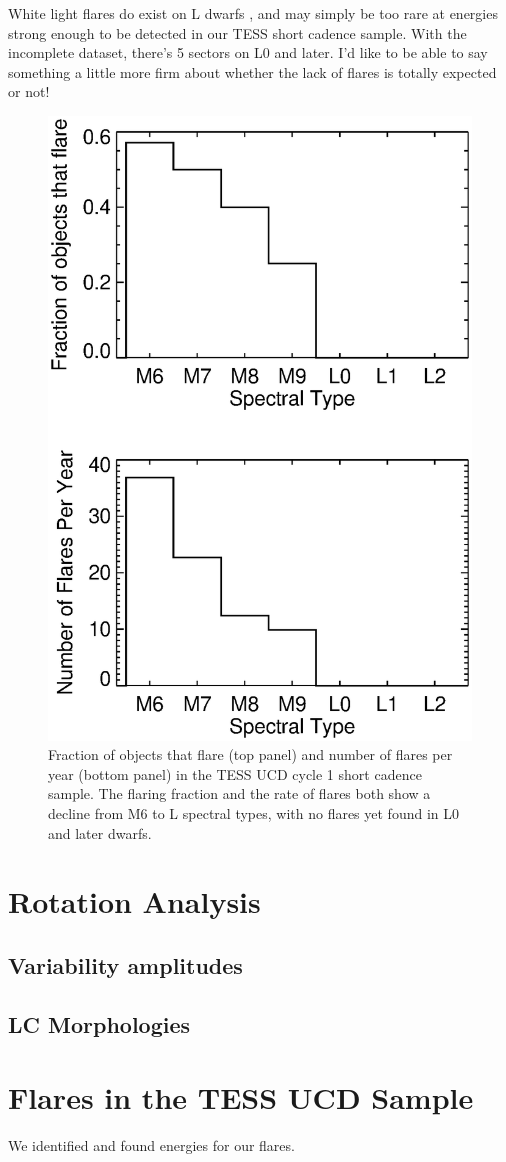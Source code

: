\documentclass{aastex62}
\begin{document}
White light flares do exist on L dwarfs \citep{Schmidt2016a,Paudel2017}, and may simply be too rare at energies strong enough to be detected in our TESS short cadence sample. With the incomplete dataset, there's 5 sectors on L0 and later. I'd like to be able to say something a little more firm about whether the lack of flares is totally expected or not! 

\citep{Schmidt2015}
\begin{figure}
	\includegraphics[width=0.5\columnwidth]{flare_stats.eps}
    \caption{Fraction of objects that flare (top panel) and number of flares per year (bottom panel) in the TESS UCD cycle 1 short cadence sample. The flaring fraction and the rate of flares both show a decline from M6 to L spectral types, with no flares yet found in L0 and later dwarfs.}
    \label{fig:stflare}
\end{figure}

\section{Rotation Analysis} \label{sec:rot}
\subsection{Variability amplitudes} \label{subsec:varamp}
\subsection{LC Morphologies} \label{subsec:LCmorph}

\section{Flares in the TESS UCD Sample} \label{sec:Flares}
We identified and found energies for our flares. 
\end{document}
